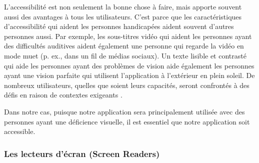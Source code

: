 L’accessibilité est non seulement la bonne chose à faire, mais apporte souvent aussi des avantages à tous les utilisateurs. C’est parce que les caractéristiques d’accessibilité qui aident les personnes handicapées aident souvent d’autres personnes aussi. Par exemple, les sous-titres vidéo qui aident les personnes ayant des difficultés auditives aident également une personne qui regarde la vidéo en mode muet (p. ex., dans un fil de médias sociaux). Un texte lisible et contrasté qui aide les personnes ayant des problèmes de vision aide également les personnes ayant une vision parfaite qui utilisent l’application à l’extérieur en plein soleil. De nombreux utilisateurs, quelles que soient leurs capacités, seront confrontés à des défis en raison de contextes exigeants \cite{what-is-accessibility}.

Dans notre cas, puisque notre application sera principalement utilisée avec des personnes ayant une déficience visuelle, il est essentiel que notre application soit accessible.


\subsubsection{Les lecteurs d'écran (Screen Readers)}